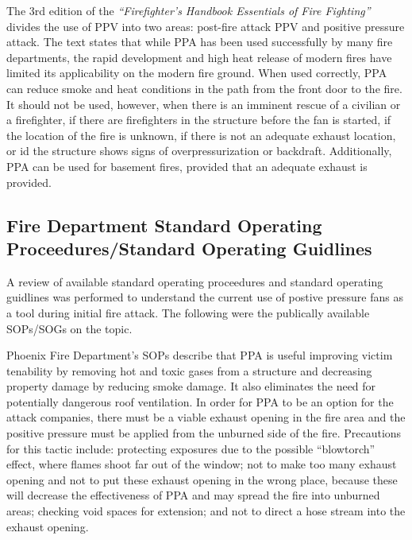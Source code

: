 \documentclass{article}
\begin{document}
The 3rd edition of the \textit{``Firefighter’s Handbook Essentials of Fire Fighting''} divides the use of PPV into two areas: post-fire attack PPV and positive pressure attack. The text states that while PPA has been used successfully by many fire departments, the rapid development and high heat release of modern fires have limited its applicability on the modern fire ground. When used correctly, PPA can reduce smoke and heat conditions in the path from the front door to the fire. It should not be used, however, when there is an imminent rescue of a civilian or a firefighter, if there are firefighters in the structure before the fan is started, if the location of the fire is unknown, if there is not an adequate exhaust location, or id the structure shows signs of overpressurization or backdraft. Additionally, PPA can be used for basement fires, provided that an adequate exhaust is provided.\cite{FFHandbook}

\subsection{Fire Department Standard Operating Proceedures/Standard Operating Guidlines}
A review of available standard operating proceedures and standard operating guidlines was performed to understand the current use of postive pressure fans as a tool during initial fire attack. The following were the publically available SOPs/SOGs on the topic. 

Phoenix Fire Department’s SOPs describe that PPA is useful improving victim tenability by removing hot and toxic gases from a structure and decreasing property damage by reducing smoke damage. It also eliminates the need for potentially dangerous roof ventilation. In order for PPA to be an option for the attack companies, there must be a viable exhaust opening in the fire area and the positive pressure must be applied from the unburned side of the fire. Precautions for this tactic include: protecting exposures due to the possible “blowtorch” effect, where flames shoot far out of the window; not to make too many exhaust opening and not to put these exhaust opening in the wrong place, because these will decrease the effectiveness of PPA and may spread the fire into unburned areas; checking void spaces for extension; and not to direct a hose stream into the exhaust opening.\cite{PhoenixPPVSOG}
\end{document}
